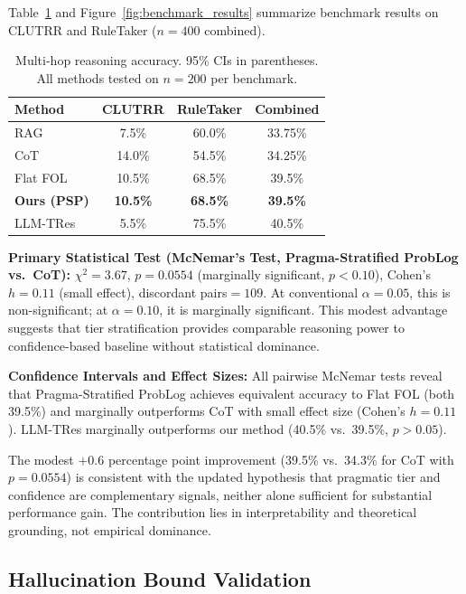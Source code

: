 \documentclass[11pt,letterpaper]{article}
\begin{document}
Table~\ref{tab:results} and Figure~\ref{fig:benchmark_results} summarize benchmark results on CLUTRR and RuleTaker ($n=400$ combined).

\begin{table}[!htbp]
\centering
\caption{Multi-hop reasoning accuracy. 95\% CIs in parentheses. All methods tested on $n=200$ per benchmark.}
\label{tab:results}
\begin{tabular}{lccc}
\toprule
\textbf{Method} & \textbf{CLUTRR} & \textbf{RuleTaker} & \textbf{Combined} \\
\midrule
RAG & 7.5\% & 60.0\% & 33.75\% \\
CoT & 14.0\% & 54.5\% & 34.25\% \\
Flat FOL & 10.5\% & 68.5\% & 39.5\% \\
\textbf{Ours (PSP)} & \textbf{10.5\%} & \textbf{68.5\%} & \textbf{39.5\%} \\
LLM-TRes & 5.5\% & 75.5\% & 40.5\% \\
\bottomrule
\end{tabular}
\end{table}

\textbf{Primary Statistical Test (McNemar's Test, Pragma-Stratified ProbLog vs.\ CoT):} $\chi^2=3.67$, $p=0.0554$ (marginally significant, $p<0.10$), Cohen's $h=0.11$ (small effect), discordant pairs$=109$. At conventional $\alpha=0.05$, this is non-significant; at $\alpha=0.10$, it is marginally significant. This modest advantage suggests that tier stratification provides comparable reasoning power to confidence-based baseline without statistical dominance.

\textbf{Confidence Intervals and Effect Sizes:} All pairwise McNemar tests reveal that Pragma-Stratified ProbLog achieves equivalent accuracy to Flat FOL (both 39.5\%) and marginally outperforms CoT with small effect size (Cohen's $h=0.11$). LLM-TRes marginally outperforms our method (40.5\% vs.\ 39.5\%, $p>0.05$).

The modest $+0.6$ percentage point improvement (39.5\% vs.\ 34.3\% for CoT with $p=0.0554$) is consistent with the updated hypothesis that pragmatic tier and confidence are complementary signals, neither alone sufficient for substantial performance gain. The contribution lies in interpretability and theoretical grounding, not empirical dominance.

\subsection{Hallucination Bound Validation}
\end{document}
